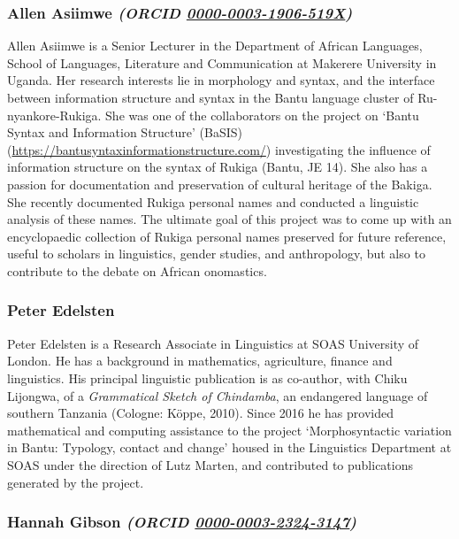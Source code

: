 

\newcommand{\ORCID}[1]{{\itshape (ORCID \href{https://orcid.org/#1}{#1})}}
\subsubsection*{Allen Asiimwe \ORCID{0000-0003-1906-519X}}
Allen Asiimwe is a Senior Lecturer in the Department of African Languages, School of Languages, Literature and Communication at Makerere University in Uganda. Her research interests lie in morphology and syntax, and the interface between information structure and syntax in the Bantu language cluster of Ru-nyankore-Rukiga. She was one of the collaborators on the project on ‘Bantu Syntax and Information Structure’ (BaSIS) (\url{https://bantusyntaxinformationstructure.com/}) investigating the influence of information structure on the syntax of Rukiga (Bantu, JE 14). She also has a passion for documentation and preservation of cultural heritage of the Bakiga. She recently documented Rukiga personal names and conducted a linguistic analysis of these names. The ultimate goal of this project was to come up with an encyclopaedic collection of Rukiga personal names preserved for future reference, useful to scholars in linguistics, gender studies, and anthropology, but also to contribute to the debate on African onomastics.

\subsubsection*{Peter Edelsten}
Peter Edelsten is a Research Associate in Linguistics at SOAS University of London. He has a background in mathematics, agriculture, finance and linguistics. His principal linguistic publication is as co-author, with Chiku Lijongwa, of a \textit{Grammatical Sketch of Chindamba}, an endangered language of southern Tanzania (Cologne: Köppe, 2010). {Since 2016} he has provided mathematical and computing assistance to the project ‘Morphosyntactic variation in Bantu: Typology, contact and change’ housed in the Linguistics Department at SOAS under the direction of Lutz Marten, and contributed to publications generated by the project.

\subsubsection*{Hannah Gibson  \ORCID{0000-0003-2324-3147}}

